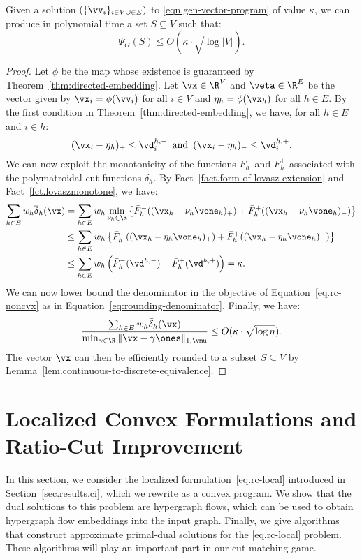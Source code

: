 \documentclass[letterpaper]{article}
\begin{document}
\begin{lemma}
    Given a solution $(\{\vv_i\}_{i\in V \cup \in E})$ to \ref{eqn.gen-vector-program} of value $\kappa$, we can produce in polynomial time a set $S \subseteq V$ such that:
    $$
    \Psi_G(S) \leq O(\kappa \cdot \sqrt{\log |V|}).
    $$
\end{lemma}
\begin{proof}
Let $\phi$ be the map whose existence is guaranteed by Theorem~\ref{thm:directed-embedding}. Let $\vx\in \R^{V}$ and $\veta \in \R^E$  be the vector given by $\vx_i = \phi(\vv_i)$ for all $i \in V$ and $\eta_h = \phi(\vx_h)$ for all $h \in E.$ By the first condition in Theorem~\ref{thm:directed-embedding}, we have, for all $h \in E$ and $i \in h$:
$$
(\vx_i - \eta_h)_+ \leq \vd^{h,-}_i \, \textrm{ and } \, (\vx_i -\eta_h)_- \leq \vd^{h,+}_i.
$$
We can now exploit the monotonicity of the functions $F^{-}_h$ and $F^{+}_h$ associated with the polymatroidal cut functions $\delta_h$. By Fact~\ref{fact.form-of-lovasz-extension} and Fact~\ref{fct.lovaszmonotone}, we have:
\begin{align*}
    \sum_{h\in E} w_h \overline{\delta}_h(\vx) &=
    \sum_{h\in E} w_h \min_{\nu_h \in \R}\left\{\bar{F}^-_h((\vx_h-\nu_h\vone_h)_+) + \bar{F}^+_h((\vx_h-\nu_h\vone_h)_-)\right\} \\
    & \leq \sum_{h\in E} w_h \left\{\bar{F}^-_h((\vx_h-\eta_h\vone_h)_+) + \bar{F}^+_h((\vx_h-\eta_h \vone_h)_-)\right\}\\
    & \leq \sum_{h\in E} w_h \left(\bar{F}^-_h(\vd^{h,-}) + \bar{F}^+_h(\vd^{h,+})\right) = \kappa.
    \end{align*}
We can now lower bound the denominator in the objective of Equation~\eqref{eq.rc-noncvx} as in Equation~\ref{eq:rounding-denominator}. Finally, we have:
\[
   {\sum_{h \in E} w_h  \bar{\delta}_h (\vx) \over \min_{\gamma \in \R} \|\vx - \gamma\ones\|_{1, \vmu}}
  \leq
  O(\kappa \cdot \sqrt{\log n}).
\]
The vector $\vx$ can then be efficiently rounded to a subset $S\subseteq V$ by Lemma~\ref{lem.continuous-to-discrete-equivalence}.
\end{proof}
 

\section{Localized Convex Formulations and Ratio-Cut Improvement}
\label{sec.ci}

In this section, we consider the localized formulation~\eqref{eq.rc-local} introduced in Section~\ref{sec.results.ci}, which we rewrite as a convex program. We show that the dual solutions to this problem are hypergraph flows, which can be used to obtain hypergraph flow embeddings into the input graph. Finally, we give algorithms that construct approximate primal-dual solutions for the \eqref{eq.rc-local} problem. These algorithms will play an important part in our cut-matching game.
\end{document}
